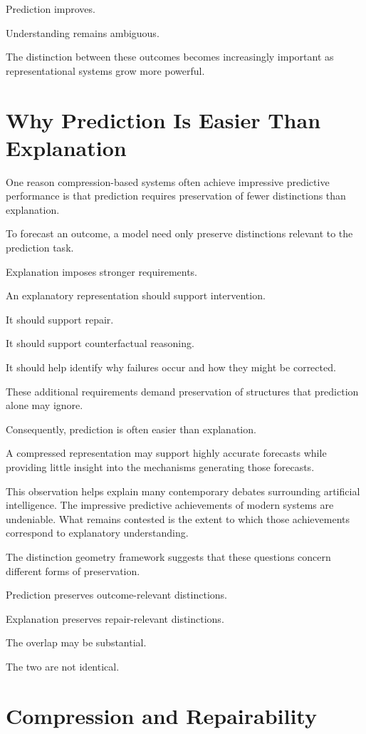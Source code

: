 \documentclass[11pt,oneside,openany]{book}
\begin{document}
Prediction improves.

Understanding remains ambiguous.

The distinction between these outcomes becomes increasingly important as representational systems grow more powerful.

\section{Why Prediction Is Easier Than Explanation}

One reason compression-based systems often achieve impressive predictive performance is that prediction requires preservation of fewer distinctions than explanation.

To forecast an outcome, a model need only preserve distinctions relevant to the prediction task.

Explanation imposes stronger requirements.

An explanatory representation should support intervention.

It should support repair.

It should support counterfactual reasoning.

It should help identify why failures occur and how they might be corrected.

These additional requirements demand preservation of structures that prediction alone may ignore.

Consequently, prediction is often easier than explanation.

A compressed representation may support highly accurate forecasts while providing little insight into the mechanisms generating those forecasts.

This observation helps explain many contemporary debates surrounding artificial intelligence. The impressive predictive achievements of modern systems are undeniable. What remains contested is the extent to which those achievements correspond to explanatory understanding.

The distinction geometry framework suggests that these questions concern different forms of preservation.

Prediction preserves outcome-relevant distinctions.

Explanation preserves repair-relevant distinctions.

The overlap may be substantial.

The two are not identical.

\section{Compression and Repairability}
\end{document}
